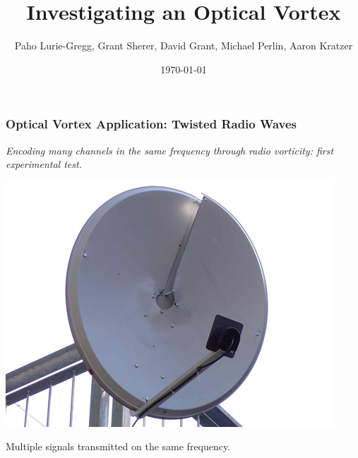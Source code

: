 \documentclass[]{beamer}
\title{Investigating an Optical Vortex}
\author{Paho Lurie-Gregg, Grant Sherer, David Grant, Michael Perlin, Aaron Kratzer}
\date{\today}
\begin{document}




\begin{frame}
	\frametitle{Optical Vortex Application: Twisted Radio Waves}
	\begin{center}
		\emph{Encoding many channels in the same frequency through radio vorticity: first experimental test.}
	\end{center}
	\begin{minipage}{0.49\textwidth}
	\includegraphics[width=\textwidth]{helical_dish}
	\end{minipage}
	\begin{minipage}{0.49\textwidth}
		\begin{items}
		\item Multiple signals transmitted on the same frequency.
		\end{items}
	\end{minipage}
	
\end{frame}


%
\end{document}
